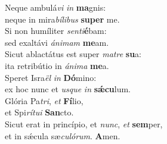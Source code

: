 \evenverse Neque ambulá\textit{vi} \textit{in} \textbf{ma}gnis:~\*\\
\evenverse neque in mira\textit{bí}\textit{li}\textit{bus} \textbf{su}\textbf{per} me.\\
\oddverse Si non humíliter \textit{sen}\textit{ti}\textbf{é}bam:~\*\\
\oddverse sed exaltávi \textit{á}\textit{ni}\textit{mam} \textbf{me}am.\\
\evenverse Sicut ablactátus est super \textit{ma}\textit{tre} \textbf{su}a:~\*\\
\evenverse ita retribútio in \textit{á}\textit{ni}\textit{ma} \textbf{me}a.\\
\oddverse Speret Isra\textit{ël} \textit{in} \textbf{Dó}mino:~\*\\
\oddverse ex hoc nunc et \textit{us}\textit{que} \textit{in} \textbf{sǽ}\textbf{cu}lum.\\
\evenverse Glória Pa\textit{tri}, \textit{et} \textbf{Fí}lio,~\*\\
\evenverse et Spi\textit{rí}\textit{tu}\textit{i} \textbf{San}cto.\\
\oddverse Sicut erat in princípio, et \textit{nunc}, \textit{et} \textbf{sem}per,~\*\\
\oddverse et in sǽcula sæ\textit{cu}\textit{ló}\textit{rum}. \textbf{A}men.\\
